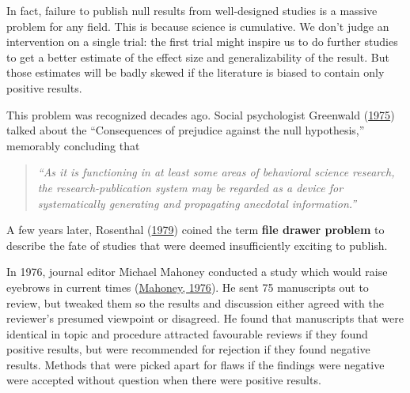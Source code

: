 \documentclass{krantz}
\begin{document}
In fact, failure to publish null results from well-designed studies is a massive problem for any field. This is because science is cumulative. We don't judge an intervention on a single trial: the first trial might inspire us to do further studies to get a better estimate of the effect size and generalizability of the result. But those estimates will be badly skewed if the literature is biased to contain only positive results.

This problem was recognized decades ago. Social psychologist Greenwald (\protect\hyperlink{ref-greenwald1975}{1975}) talked about the ``Consequences of prejudice against the null hypothesis,'' memorably concluding that

\begin{quote}
\emph{``As it is functioning in at least some areas of behavioral science research, the research-publication system may be regarded as a device for systematically generating and propagating anecdotal information.''}
\end{quote}

A few years later, Rosenthal (\protect\hyperlink{ref-rosenthal1979}{1979}) coined the term \textbf{file drawer problem} to describe the fate of studies that were deemed insufficiently exciting to publish.

In 1976, journal editor Michael Mahoney conducted a study which would raise eyebrows in current times (\protect\hyperlink{ref-mahoney1976}{Mahoney, 1976}). He sent 75 manuscripts out to review, but tweaked them so the results and discussion either agreed with the reviewer's presumed viewpoint or disagreed. He found that manuscripts that were identical in topic and procedure attracted favourable reviews if they found positive results, but were recommended for rejection if they found negative results. Methods that were picked apart for flaws if the findings were negative were accepted without question when there were positive results.
\end{document}
